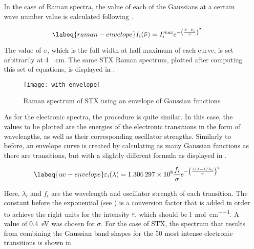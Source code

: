In the case of Raman spectra, the value of each of the Gaussians at a certain wave number value is calculated following .

\begin{equation}
    \labeq{raman-envelope}
    I_i (\tilde{\nu}) = I_i^\textit{max}e^{-\left(\frac{\tilde{\nu} - \tilde{\nu}_i}{\sigma}\right)^2}
\end{equation}

The value of $\sigma$, which is the full width at half maximum of each curve, is set arbitrarily at \SI{4}{\per\cm}.
The same STX Raman spectrum, plotted after computing this set of equations, is displayed in .

\begin{figure}
    \centering
    \texttt{[image: with-envelope]}
    \caption[Raman spectrum with Gaussian envelope]{Raman spectrum of STX using an envelope of Gaussian functions}
\end{figure}

As for the electronic spectra, the procedure is quite similar.
In this case, the values to be plotted are the energies of the electronic transitions in the form of wavelengths, as well as their corresponding oscillator strengths.
Similarly to before, an envelope curve is created by calculating as many Gaussian functions as there are transitions, but with a slightly different formula as displayed in .

\begin{equation}
    \labeq{uv-envelope}
    \varepsilon_i (\lambda) = \num{1.306297e8} \frac{f_i}{\sigma} e^{-\left(\frac{1/\lambda - 1/\lambda_i}{\sigma}\right)^2}
\end{equation}

Here, $\lambda_i$ and $f_i$ are the wavelength and oscillator strength of each transition. The constant before the exponential (see ) is a conversion factor that is added in order to achieve the right units for the intensity $\varepsilon$, which should be \si{\litre\per\mole\per\cm}.
A value of \SI{0.4}{\eV} was chosen for $\sigma$.
For the case of STX, the spectrum that results from combining the Gaussian band shapes for the 50 most intense electronic transitions is shown in 

